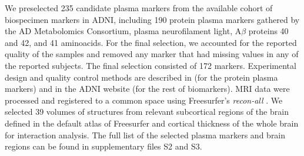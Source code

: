 \begin{table}[!htbp]
\centering
{}
\caption[Demographic information of the studied cohort.]{Demographic information of the studied cohort. Categorical variables are expressed as counts and percentages. Continuous variables are expressed as mean $\pm$ standard deviation. CN: Cognitive normal. MCI: Mild cognitive impairment. AD: Alzheimer's disease. ApoE4: Apolipoprotein E4.  MMSE: mini-mental state examination.}
\label{tab:data}
\end{table}

We preselected 235 candidate plasma markers from the available cohort of biospecimen markers in ADNI, including 190 protein plasma markers gathered by the AD Metabolomics Consortium, plasma neurofilament light, A$\beta$ proteins 40 and 42, and 41 aminoacids. For the final selection, we accounted for the reported quality of the samples and removed any marker that had missing values in any of the reported subjects. The final selection consisted of 172 markers. Experimental design and quality control methods are described in \cite{DataPrimer} (for the protein plasma markers) and in the ADNI website (for the rest of biomarkers). MRI data were processed and registered to a common space using Freesurfer's \textit{recon-all} \cite{Fischl2012}. We selected 39 volumes of structures from relevant subcortical regions of the brain defined in the default atlas of Freesurfer \cite{Fischl2002} and cortical thickness of the whole brain for interaction analysis. The full list of the selected plasma markers and brain regions can be found in supplementary files S2 and S3. \\

